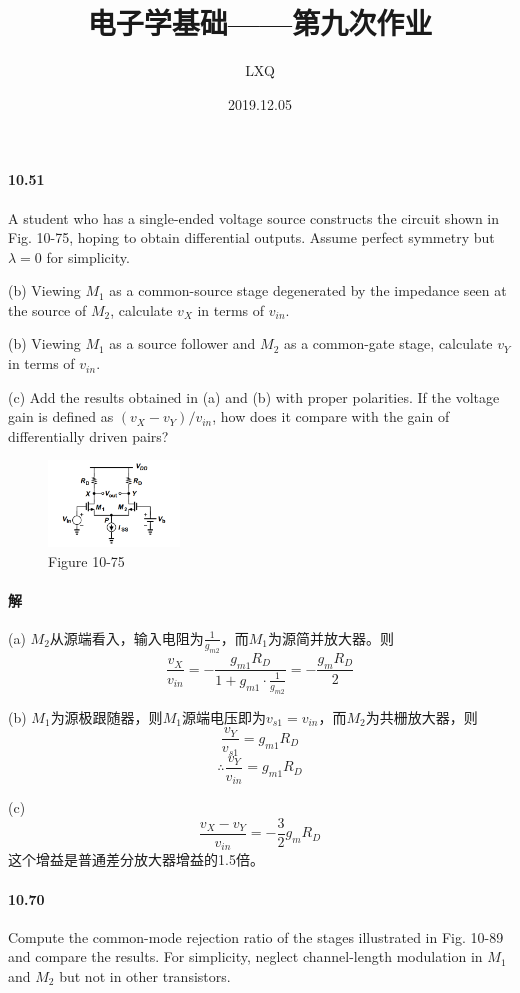 \documentclass[hyperref, UTF8]{ctexart}
\title{电子学基础——第九次作业}
\author{LXQ}
\date{2019.12.05}
\newcommand{\under}[1]{\frac{1}{#1}}
\begin{document}
\maketitle

\paragraph{10.51} \label{10.51}
    A student who has a single-ended voltage source constructs the circuit shown in Fig. 10-75, hoping to obtain differential outputs. Assume perfect symmetry but $\lambda = 0$ for simplicity. 

    (b) Viewing $M_1$ as a common-source stage degenerated by the impedance seen at the source of $M_2$, calculate $v_X$ in terms of $v_{in}$.

    (b) Viewing $M_1$ as a source follower and $M_2$ as a common-gate stage, calculate $v_Y$ in terms of $v_{in}$.

    (c) Add the results obtained in (a) and (b) with proper polarities. If the voltage gain is defined as $(v_X - v_Y)/v_{in}$, how does it compare with the gain of differentially driven pairs?

    \begin{figure}[!htb]
        \centering
        \includegraphics[width=0.312\textwidth]{p10-75.png}
        \caption*{Figure 10-75}
    \end{figure}

\paragraph{解}
    (a) $M_2$从源端看入，输入电阻为$\under{g_{m2}}$，而$M_1$为源简并放大器。则
    $$\frac{v_X}{v_{in}} = -\frac{g_{m1}R_D}{1+g_{m1}\cdot \under{g_{m2}}} = -\frac{g_mR_D}{2}$$

    (b) $M_1$为源极跟随器，则$M_1$源端电压即为$v_{s1}=v_{in}$，而$M_2$为共栅放大器，则
    $$\frac{v_Y}{v_{s1}}=g_{m1}R_D$$
    $$\therefore \frac{v_Y}{v_{in}}=g_{m1}R_D$$

    (c) $$\frac{v_X-v_Y}{v_{in}}=-\frac{3}{2}g_mR_D$$
    这个增益是普通差分放大器增益的1.5倍。

\paragraph{10.70} \label{10.70}
    Compute the common-mode rejection ratio of the stages illustrated in Fig. 10-89 and compare the results. For simplicity, neglect channel-length modulation in $M_1$ and $M_2$ but not in other transistors.
\end{document}
